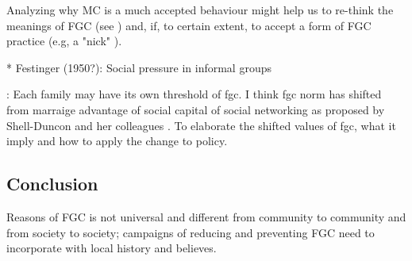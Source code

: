 \documentclass[12pt,]{article}
\begin{document}
Analyzing why MC is a much accepted behaviour might help us to re-think the meanings of FGC (see \cite{DarbSvob07}) and, if, to certain extent, to accept a form of FGC practice (e.g, a "nick" \cite{Wade11}).



 * Festinger (1950?):  Social pressure in informal groups


\cite{EffeVoge15}:  Each family may have its own threshold of fgc. I think fgc norm has shifted from marraige advantage of social capital of social networking as proposed by Shell-Duncon and her colleagues \cite{ShelWand11}.  To elaborate the shifted values of fgc, what it imply and how to apply the change to policy.


\subsection{Conclusion}\label{Conclusion}

Reasons of FGC is not universal and different from community to community and from society to society; campaigns of reducing and preventing FGC need to incorporate with local history and believes.
\end{document}

